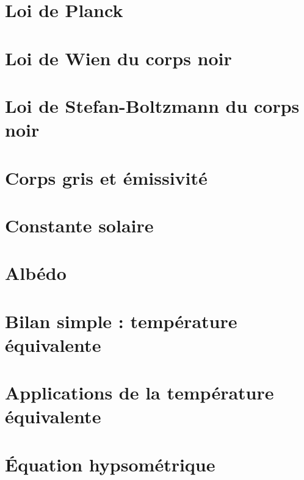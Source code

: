 \documentclass[a4paper,DIV16,10pt]{scrartcl}
\begin{document}
\newpage
\section{Loi de Planck}


\newpage
\section{Loi de Wien du corps noir}


\newpage
\section{Loi de Stefan-Boltzmann du corps noir}


\newpage
\section{Corps gris et émissivité}


\newpage
\section{Constante solaire}



\newpage 
\section{Albédo} 


\newpage
\section{Bilan simple : température équivalente}



\newpage
\section{Applications de la température équivalente}










\newpage
\section{\'Equation hypsométrique}

\end{document}

